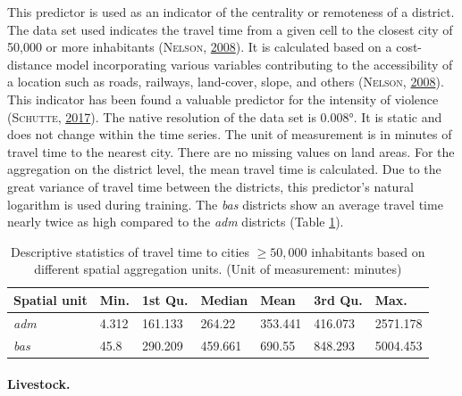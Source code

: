 \documentclass[a4paper,11pt]{article}
\begin{document}
This predictor is used as an indicator of the centrality or remoteness of a district.
The data set used indicates the travel time from a given cell to the closest
city of 50,000 or more inhabitants \textsc{(\textnormal{\textsc{Nelson}}, \textnormal{\protect\hyperlink{ref-nelson2008}{2008}})}. It is calculated based on a cost-distance
model incorporating various variables contributing to the accessibility of a location
such as roads, railways, land-cover, slope, and others \textsc{(\textnormal{\textsc{Nelson}}, \textnormal{\protect\hyperlink{ref-nelson2008}{2008}})}. This indicator
has been found a valuable predictor for the intensity of violence \textsc{(\textnormal{\textsc{Schutte}}, \textnormal{\protect\hyperlink{ref-schutte2017}{2017}})}.
The native resolution of the data set is 0.008°. It is static and does not
change within the time series. The unit of measurement is in minutes of travel time
to the nearest city. There are no missing values on land areas. For the aggregation
on the district level, the mean travel time is calculated. Due to the great variance
of travel time between the districts, this predictor's natural logarithm is used
during training. The \emph{bas} districts show an average travel time nearly twice as
high compared to the \emph{adm} districts (Table \ref{tab:02-data-trt}).
\begin{table}[H]

\caption[Descriptive statistics of travel time to cities $\geq 50,000$ inhabitants.]{\label{tab:02-data-trt}Descriptive statistics of travel time to cities $\geq 50,000$ inhabitants based on different spatial
               aggregation units. (Unit of measurement: minutes)}
\centering
\fontsize{10}{12}\selectfont
\begin{tabular}[t]{lllllll}
\toprule
Spatial unit & Min. & 1st Qu. & Median & Mean & 3rd Qu. & Max.\\
\midrule
\textit{adm} & 4.312 & 161.133 & 264.22 & 353.441 & 416.073 & 2571.178\\
\textit{bas} & 45.8 & 290.209 & 459.661 & 690.55 & 848.293 & 5004.453\\
\bottomrule
\end{tabular}
\end{table}
\hypertarget{livestock.}{%
\paragraph{Livestock.}\label{livestock.}}
\end{document}
